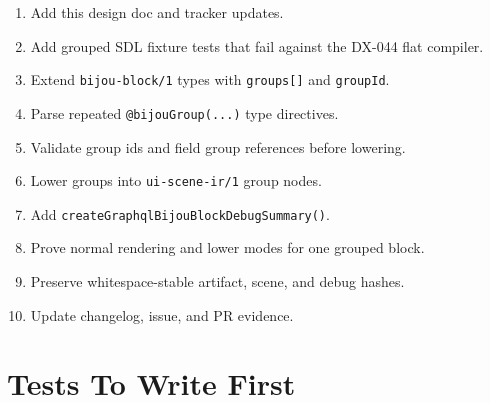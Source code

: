 \begin{enumerate}
\def\labelenumi{\arabic{enumi}.}
\tightlist
\item
  Add this design doc and tracker updates.
\item
  Add grouped SDL fixture tests that fail against the DX-044 flat compiler.
\item
  Extend \texttt{b\allowbreak{}i\allowbreak{}j\allowbreak{}o\allowbreak{}u\allowbreak{}-\allowbreak{}b\allowbreak{}l\allowbreak{}o\allowbreak{}c\allowbreak{}k\allowbreak{}/\allowbreak{}1} types with \texttt{g\allowbreak{}r\allowbreak{}o\allowbreak{}u\allowbreak{}p\allowbreak{}s\allowbreak{}[\allowbreak{}]} and \texttt{g\allowbreak{}r\allowbreak{}o\allowbreak{}u\allowbreak{}p\allowbreak{}I\allowbreak{}d}.
\item
  Parse repeated \texttt{@\allowbreak{}b\allowbreak{}i\allowbreak{}j\allowbreak{}o\allowbreak{}u\allowbreak{}G\allowbreak{}r\allowbreak{}o\allowbreak{}u\allowbreak{}p\allowbreak{}(\allowbreak{}.\allowbreak{}.\allowbreak{}.\allowbreak{})} type directives.
\item
  Validate group ids and field group references before lowering.
\item
  Lower groups into \texttt{u\allowbreak{}i\allowbreak{}-\allowbreak{}s\allowbreak{}c\allowbreak{}e\allowbreak{}n\allowbreak{}e\allowbreak{}-\allowbreak{}i\allowbreak{}r\allowbreak{}/\allowbreak{}1} group nodes.
\item
  Add \texttt{c\allowbreak{}r\allowbreak{}e\allowbreak{}a\allowbreak{}t\allowbreak{}e\allowbreak{}G\allowbreak{}r\allowbreak{}a\allowbreak{}p\allowbreak{}h\allowbreak{}q\allowbreak{}l\allowbreak{}B\allowbreak{}i\allowbreak{}j\allowbreak{}o\allowbreak{}u\allowbreak{}B\allowbreak{}l\allowbreak{}o\allowbreak{}c\allowbreak{}k\allowbreak{}D\allowbreak{}e\allowbreak{}b\allowbreak{}u\allowbreak{}g\allowbreak{}S\allowbreak{}u\allowbreak{}m\allowbreak{}m\allowbreak{}a\allowbreak{}r\allowbreak{}y\allowbreak{}(\allowbreak{})}.
\item
  Prove normal rendering and lower modes for one grouped block.
\item
  Preserve whitespace-stable artifact, scene, and debug hashes.
\item
  Update changelog, issue, and PR evidence.
\end{enumerate}

\section{Tests To Write First}\label{record-141-tests-to-write-first}

